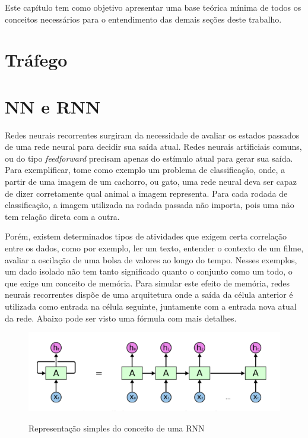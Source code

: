 Este capítulo tem como objetivo apresentar uma base teórica mínima de todos os conceitos necessários para o entendimento das demais seções deste trabalho.
\section{Tráfego}


\section{\acrfull{NN} e \acrfull{RNN}}

Redes neurais recorrentes surgiram da necessidade de avaliar os estados passados de uma rede neural para decidir sua saída atual. Redes neurais artificiais comuns, ou do tipo \textit{feedforward} precisam apenas do estímulo atual para gerar sua saída. Para exemplificar, tome como exemplo um problema de classificação, onde, a partir de uma imagem de um cachorro, ou gato, uma rede neural deva ser capaz de dizer corretamente qual animal a imagem representa. Para cada rodada de classificação, a imagem utilizada na rodada passada não importa, pois uma não tem relação direta com a outra. 

Porém, existem determinados tipos de atividades que exigem certa correlação entre os dados, como por exemplo, ler um texto, entender o contexto de um filme, avaliar a oscilação de uma bolsa de valores ao longo do tempo. Nesses exemplos, um dado isolado não tem tanto significado quanto o conjunto como um todo, o que exige um conceito de memória. Para simular este efeito de memória, redes neurais recorrentes dispõe de uma arquitetura onde a saída da célula anterior é utilizada como entrada na célula seguinte, juntamente com a entrada nova atual da rede. Abaixo pode ser visto uma fórmula com mais detalhes.

\begin{figure}[htb]
    \centering
    \includegraphics[scale=0.4]{rnnExample.png}
    \label{figure:eixo}
    \caption[Representação simples do conceito de um RNN]{Representação simples do conceito de uma RNN \footnotemark}
\end{figure}

